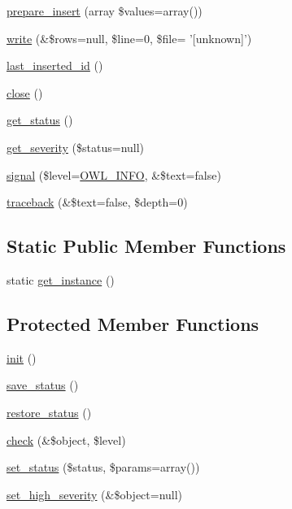 \begin{DoxyCompactItemize}
\item 
\hyperlink{classDbHandler_a157e507b2d562331d2e6fdbada61d604}{prepare\_\-insert} (array \$values=array())
\item 
\hyperlink{classDbHandler_ac02a117c76d5d20ec950fcd5aae9cf8d}{write} (\&\$rows=null, \$line=0, \$file= '\mbox{[}unknown\mbox{]}')
\item 
\hyperlink{classDbHandler_ad6be57a8dbb86dc1648c79b96128fc97}{last\_\-inserted\_\-id} ()
\item 
\hyperlink{classDbHandler_ad3d2853bbd2d1962710907e34afb424f}{close} ()
\item 
\hyperlink{class__OWL_a99ec771fa2c5c279f80152cc09e489a8}{get\_\-status} ()
\item 
\hyperlink{class__OWL_adf9509ef96858be7bdd9414c5ef129aa}{get\_\-severity} (\$status=null)
\item 
\hyperlink{class__OWL_a51ba4a16409acf2a2f61f286939091a5}{signal} (\$level=\hyperlink{owl_8severitycodes_8php_a139328861128689f2f4def6a399d9057}{OWL\_\-INFO}, \&\$text=false)
\item 
\hyperlink{class__OWL_aa29547995d6741b7d2b90c1d4ea99a13}{traceback} (\&\$text=false, \$depth=0)
\end{DoxyCompactItemize}
\subsection*{Static Public Member Functions}
\begin{DoxyCompactItemize}
\item 
static \hyperlink{classDbHandler_ae9bfc8bdc6a8077adb342702aaffc9af}{get\_\-instance} ()
\end{DoxyCompactItemize}
\subsection*{Protected Member Functions}
\begin{DoxyCompactItemize}
\item 
\hyperlink{class__OWL_ae0ef3ded56e8a6b34b6461e5a721cd3e}{init} ()
\item 
\hyperlink{class__OWL_a9e49b9c76fbc021b244c6915ea536d71}{save\_\-status} ()
\item 
\hyperlink{class__OWL_a465eeaf40edd9f9c848841700c32ce55}{restore\_\-status} ()
\item 
\hyperlink{class__OWL_ad6f4f6946f40199dd0333cf219fa500e}{check} (\&\$object, \$level)
\item 
\hyperlink{class__OWL_aea912d0ede9b3c2a69b79072d94d4787}{set\_\-status} (\$status, \$params=array())
\item 
\hyperlink{class__OWL_a576829692a3b66e3d518853bf43abae3}{set\_\-high\_\-severity} (\&\$object=null)
\end{DoxyCompactItemize}
